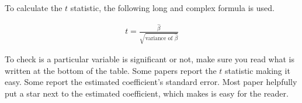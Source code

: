 \documentclass[12pt,onesided]{article}
\begin{document}
To calculate the $t$ statistic, the following long and complex
formula is used.

\begin{align*}
    t = \frac{\hat{\beta}}{\sqrt{\text{variance of }\hat{\beta}}}
\end{align*}

To check is a particular variable is significant or not, make sure
you read what is written at the bottom of the table. Some papers
report the $t$ statistic making it easy. Some report the estimated
coefficient's standard error. Most paper helpfully put a star next
to the estimated coefficient, which makes is easy for the reader.
\end{document}
